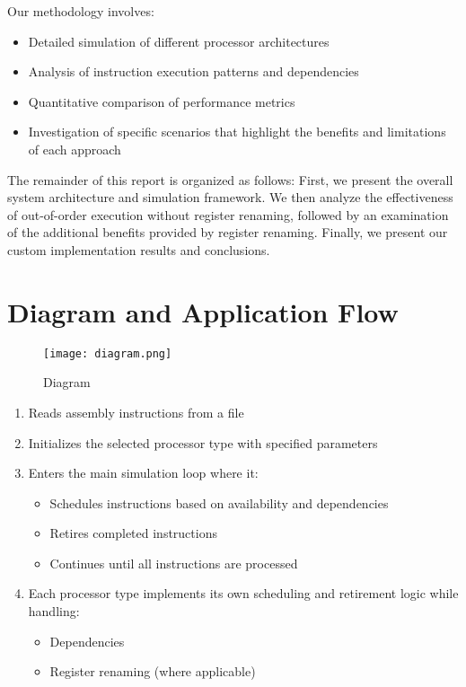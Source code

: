 \documentclass{article}
\begin{document}
Our methodology involves:
\begin{itemize}
    \item Detailed simulation of different processor architectures
    \item Analysis of instruction execution patterns and dependencies
    \item Quantitative comparison of performance metrics
    \item Investigation of specific scenarios that highlight the benefits and limitations of each approach
\end{itemize}

The remainder of this report is organized as follows: First, we present the overall system architecture and simulation framework. We then analyze the effectiveness of out-of-order execution without register renaming, followed by an examination of the additional benefits provided by register renaming. Finally, we present our custom implementation results and conclusions.

\section{Diagram and Application Flow}
\begin{figure}[h!]
    \centering
    \texttt{[image: diagram.png]}
    \caption{Diagram}
    \label{fig:enter-label}
\end{figure}
\begin{enumerate}
    \item Reads assembly instructions from a file
    \item Initializes the selected processor type with specified parameters
    \item Enters the main simulation loop where it:
    \begin{itemize}
        \item Schedules instructions based on availability and dependencies
        \item Retires completed instructions
        \item Continues until all instructions are processed
    \end{itemize}
    \item Each processor type implements its own scheduling and retirement logic while handling:
    \begin{itemize}
        \item Dependencies
        \item Register renaming (where applicable)
    \end{itemize}
\end{enumerate}
\end{document}

